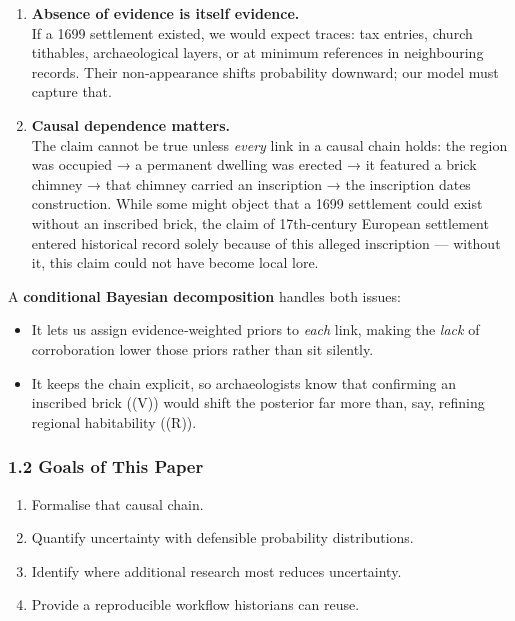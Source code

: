 \documentclass[
  11pt,
]{article}
\providecommand{\tightlist}{%
  \setlength{\itemsep}{0pt}\setlength{\parskip}{0pt}}
\begin{document}
\begin{enumerate}
\def\labelenumi{\arabic{enumi}.}
\tightlist
\item
  \textbf{Absence of evidence is itself evidence.}\\
  If a 1699 settlement existed, we would expect traces: tax entries,
  church tithables, archaeological layers, or at minimum references in
  neighbouring records. Their non‑appearance shifts probability
  downward; our model must capture that.
\item
  \textbf{Causal dependence matters.}\\
  The claim cannot be true unless \emph{every} link in a causal chain
  holds: the region was occupied → a permanent dwelling was erected → it
  featured a brick chimney → that chimney carried an inscription → the
  inscription dates construction. While some might object that a 1699
  settlement could exist without an inscribed brick, the claim of
  17th-century European settlement entered historical record solely
  because of this alleged inscription --- without it, this claim could
  not have become local lore.
\end{enumerate}

A \textbf{conditional Bayesian decomposition} handles both issues:

\begin{itemize}
\tightlist
\item
  It lets us assign evidence‑weighted priors to \emph{each} link, making
  the \emph{lack} of corroboration lower those priors rather than sit
  silently.
\item
  It keeps the chain explicit, so archaeologists know that confirming an
  inscribed brick ((V)) would shift the posterior far more than, say,
  refining regional habitability ((R)).
\end{itemize}

\subsubsection{1.2 Goals of This Paper}\label{goals-of-this-paper}

\begin{enumerate}
\def\labelenumi{\arabic{enumi}.}
\tightlist
\item
  Formalise that causal chain.
\item
  Quantify uncertainty with defensible probability distributions.
\item
  Identify where additional research most reduces uncertainty.
\item
  Provide a reproducible workflow historians can reuse.
\end{enumerate}
\end{document}
